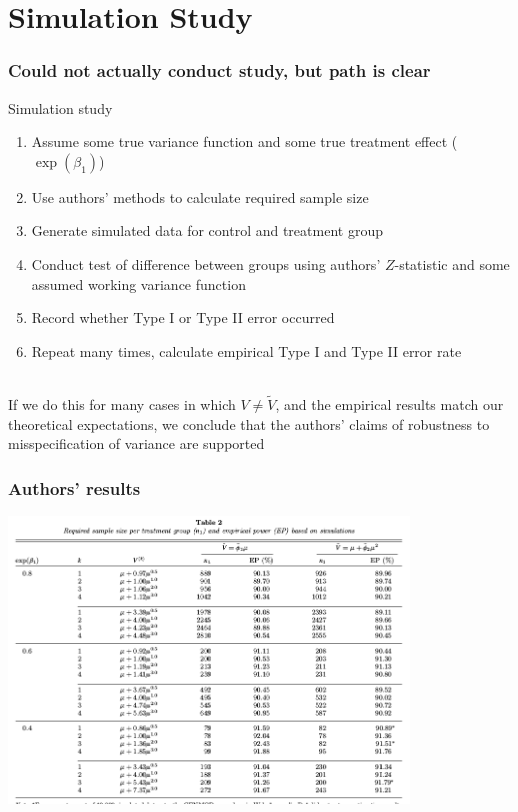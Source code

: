 \documentclass{beamer}
\begin{document}
	     \section{Simulation Study}
	     \begin{frame}
		     \frametitle{Could not actually conduct study, but path is
		     clear}
		     Simulation study
		     \begin{enumerate}
			     \item \small Assume some true variance
				     function and some true treatment effect
				     ($\exp{(\beta_1)}$) 
			     \item \small Use authors' methods to calculate
				     required sample size 
			     \item \small Generate simulated data for control
				     and treatment group 
			     \item \small Conduct test of difference between
				     groups using authors' $Z$-statistic and
				     some assumed working variance function 
			     \item \small Record whether Type I or Type II error
				     occurred
			     \item \small Repeat many times, calculate empirical
				     Type I and Type II error rate \\~\\
		     \end{enumerate}

		     If we do this for many cases in which $V \neq \tilde{V}$,
		     and the empirical results match our theoretical
		     expectations, we conclude that the authors' claims of
		     robustness to misspecification of variance are supported
	     \end{frame}
	     \begin{frame}
		     \frametitle{Authors' results}
	\begin{center}
		\includegraphics[height=3in, keepaspectratio]{table2.png}
	\end{center}
	     \end{frame}
\end{document}
